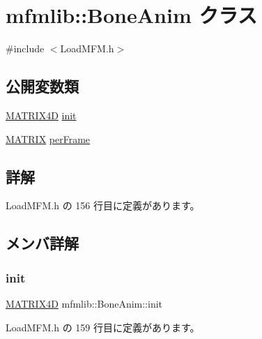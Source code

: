 \hypertarget{classmfmlib_1_1_bone_anim}{}\section{mfmlib\+:\+:Bone\+Anim クラス}
\label{classmfmlib_1_1_bone_anim}


{\ttfamily \#include $<$Load\+M\+F\+M.\+h$>$}

\subsection*{公開変数類}
\begin{DoxyCompactItemize}
\item 
\mbox{\hyperlink{structmfmlib_1_1_m_a_t_r_i_x4_d}{M\+A\+T\+R\+I\+X4D}} \mbox{\hyperlink{classmfmlib_1_1_bone_anim_a3c1f11f8db6142d65714e43d64b15d58}{init}}
\item 
\mbox{\hyperlink{classmfmlib_1_1_m_a_t_r_i_x}{M\+A\+T\+R\+IX}} \mbox{\hyperlink{classmfmlib_1_1_bone_anim_a31647fc544d8e6878209274519344ff3}{per\+Frame}}
\end{DoxyCompactItemize}


\subsection{詳解}


 Load\+M\+F\+M.\+h の 156 行目に定義があります。



\subsection{メンバ詳解}
\mbox{\label{classmfmlib_1_1_bone_anim_a3c1f11f8db6142d65714e43d64b15d58}} 
\subsubsection{\texorpdfstring{init}{init}}
{\footnotesize\ttfamily \mbox{\hyperlink{structmfmlib_1_1_m_a_t_r_i_x4_d}{M\+A\+T\+R\+I\+X4D}} mfmlib\+::\+Bone\+Anim\+::init}



 Load\+M\+F\+M.\+h の 159 行目に定義があります。

\mbox{\label{classmfmlib_1_1_bone_anim_a31647fc544d8e6878209274519344ff3}} 

